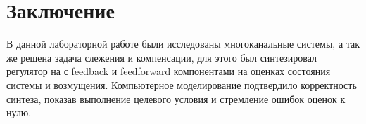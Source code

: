 \section{Заключение}

В данной лабораторной работе были исследованы многоканальные системы, а так же решена
задача слежения и компенсации, для этого был синтезировал регулятор на с feedback
и feedforward компонентами на оценках состояния системы и возмущения.
Компьютерное моделирование подтвердило корректность синтеза, показав выполнение
целевого условия и стремление ошибок оценок к нулю.